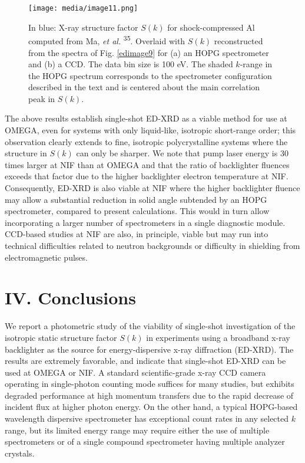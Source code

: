 \begin{figure}[h] 
\caption{ In blue: X-ray structure factor \(S(k)\) for shock-compressed
Al computed from Ma, \emph{et al.}
{\textsuperscript{35}}.
Overlaid with \(S(k)\) reconstructed from the spectra of Fig. \ref{edimage9} for (a)
an HOPG spectrometer and (b) a CCD. The data bin size is 100 eV. The
shaded \(k\)-range in the HOPG spectrum corresponds to the spectrometer
configuration described in the text and is centered about the main
correlation peak in \(S(k)\).}
\label{edimage11}
\centering
\texttt{[image: media/image11.png]}
\end{figure}
The above results establish single-shot ED-XRD as a viable method for
use at OMEGA, even for systems with only liquid-like, isotropic
short-range order; this observation clearly extends to fine, isotropic
polycrystalline systems where the structure in \(S(k)\) can only be
sharper. We note that pump laser energy is 30 times larger at NIF than
at OMEGA and that the ratio of backlighter fluences exceeds that factor
due to the higher backlighter electron temperature at NIF.
 \cite{maddox2011absolute}
Consequently, ED-XRD is also viable at NIF where the higher backlighter
fluence may allow a substantial reduction in solid angle subtended by an
HOPG spectrometer, compared to present calculations. This would in turn
allow incorporating a larger number of spectrometers in a single
diagnostic module. CCD-based studies at NIF are also, in principle,
viable but may run into technical difficulties related to neutron
backgrounds or difficulty in shielding from electromagnetic pulses.

\FloatBarrier

\section{IV. Conclusions}

We report a photometric study of the viability of single-shot
investigation of the isotropic static structure factor \(S(k)\) in
experiments using a broadband x-ray backlighter as the source for
energy-dispersive x-ray diffraction (ED-XRD). The results are extremely
favorable, and indicate that single-shot ED-XRD can be used at OMEGA or
NIF. A standard scientific-grade x-ray CCD camera operating in
single-photon counting mode suffices for many studies, but exhibits
degraded performance at high momentum transfers due to the rapid
decrease of incident flux at higher photon energy. On the other hand, a
typical HOPG-based wavelength dispersive spectrometer has exceptional
count rates in any selected \(k\) range, but its limited energy range
may require either the use of multiple spectrometers or of a single
compound spectrometer having multiple analyzer crystals.

